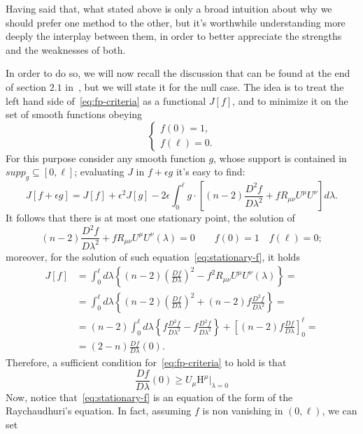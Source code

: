Having said that, what stated above is only a broad intuition about why we should prefer one method to the other, but it's worthwhile understanding more deeply the interplay between them, in order to better appreciate the strengths and the weaknesses of both.
	
In order to do so, we will now recall the discussion that can be found at the end of section \(2.1\) in~\cite{fewster2020new}, but we will state it for the null case.
The idea is to treat the left hand side of~\ref{eq:fp-criteria} as a functional \(J[f]\), and to minimize it on the set of smooth functions obeying 
\[
\begin{cases}
f(0) = 1, \\
f(\ell) = 0.
\end{cases}
\]
For this purpose consider any smooth function \(g\), whose support is contained in \(supp_g \subseteq [0, \ell]\); evaluating \(J\) in \(f + \epsilon g\) it's easy to find:
\[
J[f + \epsilon g] = J[f] + \epsilon^2J[g] - 2\epsilon\int_{0}^{\ell} g \cdot \left[(n - 2) \frac{D^2f}{D\lambda^2} + fR_{\mu\nu}U^{\mu}U^{\nu}\right] d\lambda.
\]
It follows that there is at most one stationary point, the solution of
\begin{equation}
\label{eq:stationary-f}
	(n - 2) \frac{D^2f}{D\lambda^2} + fR_{\mu\nu}U^{\mu}U^{\nu}(\lambda) = 0 \quad \quad f(0) = 1 \quad f(\ell) = 0;
\end{equation}
moreover, for the solution of such equation~\eqref{eq:stationary-f}, it holds
\begin{align*}
J[f] &= \int_{0}^{\ell} d\lambda \left\lbrace (n - 2) \left(\frac{Df}{D\lambda}\right)^2 -f^2R_{\mu\nu}U^{\mu}U^{\nu}(\lambda) \right\rbrace= \\
%	
&= \int_{0}^{\ell} d\lambda \left\lbrace (n - 2) \left(\frac{Df}{D\lambda}\right)^2 +(n - 2)f\frac{D^2f}{D\lambda^2}  \right\rbrace =\\
%	
&= (n - 2) \int_{0}^{\ell} d\lambda \left\lbrace f\frac{D^2f}{D\lambda^2} - f\frac{D^2f}{D\lambda^2} \right\rbrace + \left[(n - 2) f\frac{Df}{D\lambda} \right]_0^{\ell} =\\
%	
&= (2 - n)\frac{Df}{D\lambda}(0).	
\end{align*}
Therefore, a sufficient condition for~\eqref{eq:fp-criteria} to hold is that
\begin{equation}
	\label{eq:boundary-f}
	\frac{Df}{D\lambda}(0) \ge U_{\mu}\mathrm{H}^{\mu}\Big\vert_{\lambda = 0}
\end{equation}
Now, notice that~\eqref{eq:stationary-f} is an equation of the form of the Raychaudhuri's equation. In fact, assuming \(f\) is non vanishing in \((0, \ell)\), we can set 
